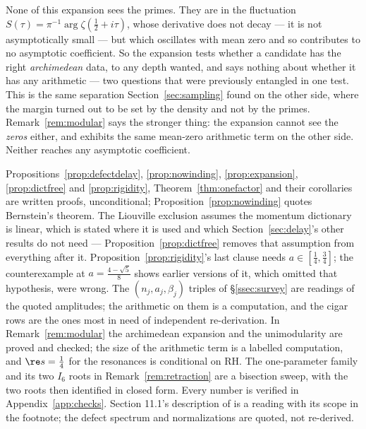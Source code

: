 \begin{remark}\label{rem:notprimes}
None of this expansion sees the primes. They are in the fluctuation
$S(\tau)=\pi^{-1}\arg\zeta(\frac12+i\tau)$, whose derivative does not decay ---
it is not asymptotically small --- but which oscillates with mean zero and so
contributes to no asymptotic coefficient. So the expansion tests whether a candidate has the right
\emph{archimedean} data, to any depth wanted, and says nothing about whether it
has any arithmetic --- two questions that were previously entangled in one test.
This is the same separation Section~\ref{sec:sampling} found on the other side,
where the margin turned out to be set by the density and not by the primes.
Remark~\ref{rem:modular} says the stronger thing: the expansion cannot see the
\emph{zeros} either, and exhibits the same mean-zero arithmetic term on the other
side. Neither reaches any asymptotic coefficient.
\end{remark}

\begin{remark}\label{rem:delaystatus}
Propositions~\ref{prop:defectdelay}, \ref{prop:nowinding}, \ref{prop:expansion},
\ref{prop:dictfree} and \ref{prop:rigidity}, Theorem~\ref{thm:onefactor} and
their corollaries are written proofs, unconditional;
Proposition~\ref{prop:nowinding} quotes Bernstein's theorem. The Liouville
exclusion assumes the momentum dictionary is linear, which is stated where it is
used and which Section~\ref{sec:delay}'s other results do not need ---
Proposition~\ref{prop:dictfree} removes that assumption from everything after it.
Proposition~\ref{prop:rigidity}'s last clause needs $a\in[\frac14,\frac34]$; the
counterexample at $a=\frac{4-\sqrt5}8$ shows earlier versions of it, which omitted
that hypothesis, were wrong. The $(n_j,a_j,\beta_j)$ triples of
\S\ref{ssec:survey} are readings of the quoted amplitudes; the arithmetic on them
is a computation, and the cigar rows are the ones most in need of independent
re-derivation. In Remark~\ref{rem:modular} the archimedean expansion and the
unimodularity are proved and checked; the size of the arithmetic term is a
labelled computation, and $\re s=\frac14$ for the resonances is conditional on
RH. The one-parameter family and its
two $I_6$ roots in Remark~\ref{rem:retraction} are a bisection sweep, with the two
roots then identified in closed form. Every number
is verified in Appendix~\ref{app:checks}. Section 11.1's description of
\cite{OWL} is a reading with its scope in the footnote; the defect spectrum and
normalizations are quoted, not re-derived.
\end{remark}
